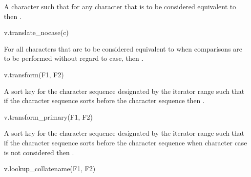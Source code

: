 \begin{itemdescr}
\pnum
\result
{}

\pnum
\returns
A character such that for any character 
that is to be considered equivalent to 
then .
\end{itemdescr}

\begin{itemdecl}
v.translate_nocase(c)
\end{itemdecl}

\begin{itemdescr}
\pnum
\result
{}

\pnum
\returns
For all characters  that are to be considered equivalent to 
when comparisons are to be performed without regard to case,
then .
\end{itemdescr}

\begin{itemdecl}
v.transform(F1, F2)
\end{itemdecl}

\begin{itemdescr}
\pnum
\result
{}

\pnum
\returns
A sort key for the character sequence designated by
the iterator range  such that
if the character sequence  sorts before
the character sequence 
then .
\end{itemdescr}

\begin{itemdecl}
v.transform_primary(F1, F2)
\end{itemdecl}

\begin{itemdescr}
\pnum
{}%
%
\result
{}

\pnum
\returns
A sort key for the character sequence designated by
the iterator range  such that
if the character sequence  sorts before
the character sequence 
when character case is not considered
then .
\end{itemdescr}

\begin{itemdecl}
v.lookup_collatename(F1, F2)
\end{itemdecl}

